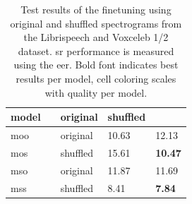 \begin{table}[h]
    \centering
    \caption{Test results of the finetuning using original and shuffled spectrograms from the Librispeech and Voxceleb 1/2 dataset. \Gls{sr} performance is measured using the \gls{eer}. Bold font indicates best results per model, cell coloring scales with quality per model.}

    \begin{tabular}{>{\centering\arraybackslash}p{1.5cm}| >{\centering\arraybackslash}p{2.5cm} >{\centering\arraybackslash}p{2.5cm}|>{\centering\arraybackslash}p{4cm}  >{\centering\arraybackslash}p{4cm}}
        \hline
        \scriptsize{model}
        & \multicolumn{2}{c|}{\scriptsize{pretraining $\downarrow$ / finetuning $\downarrow$ / test $\rightarrow$}} & original & shuffled \\
        \hline
        \gls{moo}
        & \multirow{2}{*}{original} 
        & original
        & \cellcolor[RGB]{85, 255, 0} 10.63
        & \cellcolor[RGB]{255, 215, 0} 12.13 \\
        \gls{mos}
        & 
        & shuffled
        & \cellcolor[RGB]{255, 39, 0} 15.61
        & \cellcolor[RGB]{65, 255, 0} \textbf{10.47} \\
        \hdashline
        \gls{mso}
        & \multirow{2}{*}{shuffled} & original
        & \cellcolor[RGB]{245, 235, 0} 11.87
        & \cellcolor[RGB]{245, 255, 0} 11.69\\
        \gls{mss}
        & 
        & shuffled
        & \cellcolor[RGB]{0, 255, 0} 8.41
        & \cellcolor[RGB]{0, 255, 0} \textbf{7.84}\\
        \hline
    \end{tabular}

    \label{finetuning_v1_results_transformer}
\end{table}


